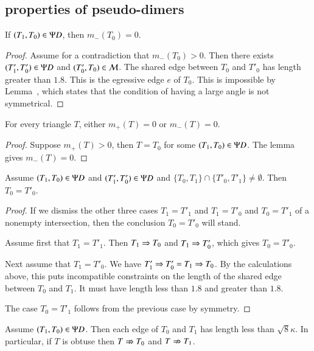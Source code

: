 \subsection{properties of pseudo-dimers}

\begin{lemma}  
If $(T_1,T_0)\in\Psi D$, then $m_-(T_0)=0$.
\end{lemma}

\begin{proof} 
  Assume for a contradiction that $m_-(T_0)>0$.  Then there exists
  $(T'_1,T_0')\in\Psi D$ and $(T'_0,T_0)\in\mathcal M$.  The shared edge between
  $T_0$ and $T'_0$ has length greater than $1.8$.  This is the
  egressive edge $e$ of $T_0$.  This is impossible by
  Lemma~, which states that the condition of having a
  large angle is not symmetrical.
\end{proof}

\begin{corollary}  
  For every triangle $T$, either $m_+(T)=0$ or $m_-(T)=0$.
\end{corollary}

\begin{proof}  
  Suppose $m_+(T)>0$, then $T=T_0$ for some $(T_1,T_0)\in\Psi D$.  The
  lemma gives $m_-(T)=0$.
\end{proof}

\begin{lemma}  
  Assume $(T_1,T_0)\in \Psi D$ and $(T'_1,T'_0)\in\Psi D$ and
  $\{T_0,T_1\}\cap\{T'_0,T'_1\} \ne \emptyset$.  Then $T_0 = T'_0$.
\end{lemma}

\begin{proof}  
  If we dismiss the other three cases $T_1=T'_1$ and $T_1=T'_0$ and
  $T_0=T'_1$ of a nonempty intersection, then the conclusion $T_0 =
  T'_0$ will stand.

  Assume first that $T_1 = T'_1$.  Then $T_1\Rightarrow T_0$ and $T_1\Rightarrow
  T'_0$, which gives $T_0=T'_0$.

  Next assume that $T_1=T'_0$.  We have $T'_1\Rightarrow T'_0 = T_1 \Rightarrow T_0$.
  By the calculations above, this puts incompatible constraints on the
  length of the shared edge between $T_0$ and $T_1$.  It must have
  length less than $1.8$ and greater than $1.8$.

  The case $T_0=T'_1$ follows from the previous case by symmetry.
\end{proof}

\begin{lemma}
  Assume $(T_1,T_0)\in\Psi D$.  Then each edge of $T_0$ and $T_1$ has
  length less than $\sqrt8\kappa$.  In particular, if $T$ is obtuse
  then $T\nRightarrow T_0$ and $T \nRightarrow T_1$.
\end{lemma}

